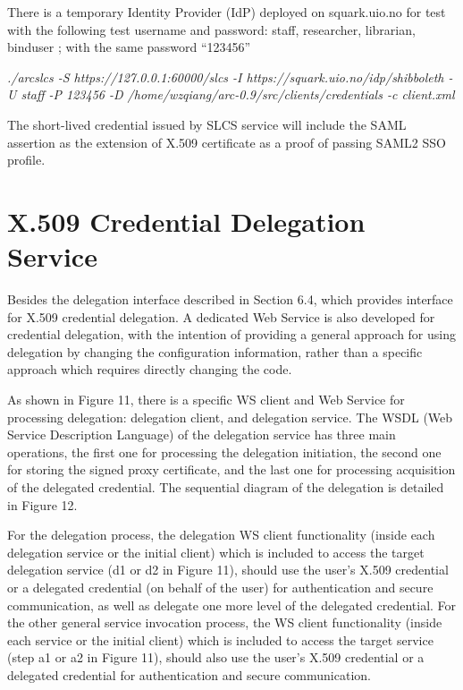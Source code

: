 \documentclass{book}
\begin{document}
    There is a temporary Identity Provider (IdP) deployed on squark.uio.no for test with the following test username and password: staff, researcher, librarian, binduser ; with the same password ``123456''

\textit{./arcslcs -S https://127.0.0.1:60000/slcs -I https://squark.uio.no/idp/shibboleth -U staff -P 123456 -D /home/wzqiang/arc-0.9/src/clients/credentials -c client.xml}

    The short-lived credential issued by SLCS service will include the SAML assertion as the extension of X.509 certificate as a proof of passing SAML2 SSO profile.





\section{X.509 Credential Delegation Service} %
\label{sec:delegation_service}
Besides the delegation interface described in Section 6.4, which provides interface for X.509 credential delegation. A dedicated Web Service is also developed for credential delegation, with the intention of providing a general approach for using delegation by changing the configuration information, rather than a specific approach which requires directly changing the code.

    As shown in Figure 11, there is a specific WS client and Web Service for processing delegation: delegation client, and delegation service. The WSDL (Web Service Description Language) of the delegation service has three main operations, the first one for processing the delegation initiation, the second one for storing the signed proxy certificate, and the last one for processing acquisition of the delegated credential. The sequential diagram of the delegation is detailed in Figure 12.

    For the delegation process, the delegation WS client functionality (inside each delegation service or the initial client) which is included to access the target delegation service (d1 or d2 in Figure 11), should use the user’s X.509 credential or a delegated credential (on behalf of the user) for authentication and secure communication, as well as delegate one more level of the delegated credential. For the other general  service invocation process, the WS client functionality (inside each service or the initial client) which is included to access the target service (step a1 or a2 in Figure 11), should also use the user’s X.509 credential or a delegated credential for authentication and secure communication.
\end{document}
